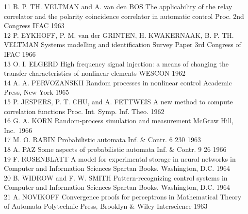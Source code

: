 11 B. P. TH. VELTMAN and A. van den BOS The applicability of the relay
correlator and the polarity coincidence correlator in automatic control
Proc. 2nd Congress IFAC 1963\\
12 P. EYKHOFF, P. M. van der GRINTEN, H. KWAKERNAAK, B. P. TH. VELTMAN
Systems modelling and identification Survey Paper 3rd Congress of IFAC
1966\\
13 O. I. ELGERD High frequency signal injection: a means of changing the
transfer characteristics of nonlinear elements WESCON 1962\\
14 A. A. PERVOZANSKII Random processes in nonlinear control Academic
Press, New York 1965\\
15 P. JESPERS, P. T. CHU, and A. FETTWEIS A new method to compute
correlation functions Proc. Int. Symp. Inf. Theo. 1962\\
16 G. A. KORN Random-process simulation and measurement McGraw Hill,
Inc.~1966\\
17 M. O. RABIN Probabilistic automata Inf. \& Contr. 6 230 1963\\
18 A. PAZ Some aspects of probabilistic automata Inf. \& Contr. 9 26
1966\\
19 F. ROSENBLATT A model for experimental storage in neural networks in
Computer and Information Sciences Spartan Books, Washington, D.C. 1964\\
20 B. WIDROW and F. W. SMITH Pattern-recognizing control systems in
Computer and Information Sciences Spartan Books, Washington, D.C. 1964\\
21 A. NOVIKOFF Convergence proofs for perceptrons in Mathematical Theory
of Automata Polytechnic Press, Brooklyn \& Wiley Interscience 1963
